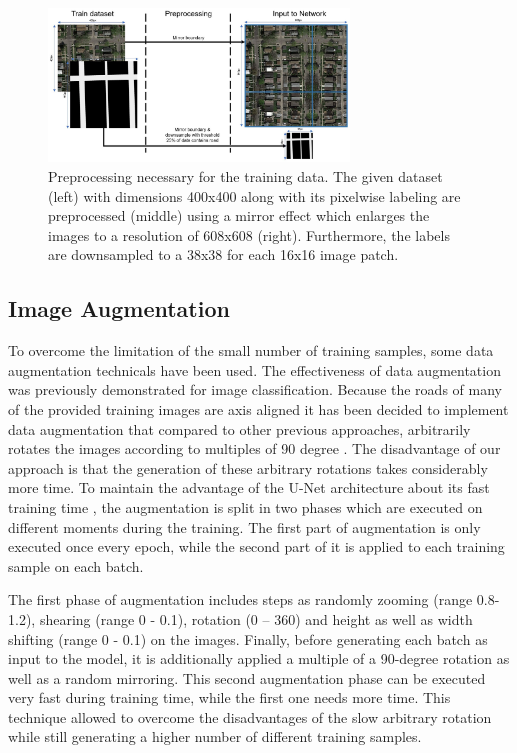 \documentclass[10pt,conference,compsocconf]{IEEEtran}
\begin{document}
\begin{figure}
\includegraphics[width={8cm}]{preprocessing}
\caption{Preprocessing necessary for the training data. The given dataset (left) with dimensions 400x400 along with its pixelwise labeling are preprocessed (middle) using a mirror effect which enlarges the images to a resolution of 608x608 (right). Furthermore, the labels are downsampled to a 38x38 for each 16x16 image patch.}
\label{fig:preprocessing}
\end{figure}

\subsection{Image Augmentation}

To overcome the limitation of the small number of training samples, some data augmentation technicals have been used. The effectiveness of data augmentation was previously demonstrated \cite{Wang} for image classification. Because the roads of many of the provided training images are axis aligned it has been decided to implement data augmentation that compared to other previous approaches, arbitrarily rotates the images  according to multiples of 90 degree \cite{Pavllo2017}. The disadvantage of our approach is that the generation of these arbitrary rotations takes considerably more time. To maintain the advantage of the U-Net architecture about its fast training time \cite{Ronneberger2015}, the augmentation is split in two phases which are executed on different moments during the training. The first part of augmentation is only executed once every epoch, while the second part of it is applied to each training sample on each batch.

The first phase of augmentation includes steps as randomly zooming (range 0.8-1.2), shearing (range 0 - 0.1), rotation (0 – 360) and height as well as width shifting (range 0 - 0.1) on the images. Finally, before generating each batch as input to the model, it is additionally applied a multiple of a 90-degree rotation as well as a random mirroring. This second augmentation phase can be executed very fast during training time, while the first one needs more time. This technique allowed to overcome the disadvantages of the slow arbitrary rotation while still generating a higher number of different training samples.
\end{document}
